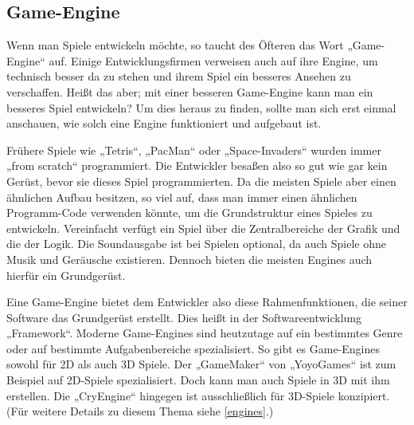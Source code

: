 \subsection{Game-Engine}	
\label{engine}
Wenn man Spiele entwickeln möchte, so taucht des Öfteren das Wort „Game-Engine“ auf. Einige Entwicklungsfirmen verweisen auch auf ihre Engine, um technisch besser da zu stehen und ihrem Spiel ein besseres Ansehen zu verschaffen. Heißt das aber; mit einer besseren Game-Engine kann man ein besseres Spiel entwickeln? Um dies heraus zu finden, sollte man sich erst einmal anschauen, wie solch eine Engine funktioniert und aufgebaut ist.

Frühere Spiele wie „Tetris“, „PacMan“ oder „Space-Invaders“ wurden immer „from scratch“  programmiert. Die Entwickler besaßen also so gut wie gar kein Gerüst, bevor sie dieses Spiel programmierten. Da die meisten Spiele aber einen ähnlichen Aufbau besitzen, so viel auf, dass man immer einen ähnlichen Programm-Code verwenden könnte, um die Grundstruktur eines Spieles zu entwickeln. Vereinfacht verfügt ein Spiel über die Zentralbereiche der Grafik und die der Logik. Die Soundausgabe ist bei Spielen optional, da auch Spiele ohne Musik und Geräusche existieren. Dennoch bieten die meisten Engines auch hierfür ein Grundgerüst.

Eine Game-Engine bietet dem Entwickler also diese Rahmenfunktionen, die seiner Software das Grundgerüst erstellt. Dies heißt in der Softwareentwicklung „Framework“. 
Moderne Game-Engines sind heutzutage auf ein bestimmtes Genre oder auf bestimmte Aufgabenbereiche spezialisiert. So gibt es Game-Engines sowohl für 2D als auch 3D Spiele. Der „GameMaker“ von „YoyoGames“ ist zum Beispiel auf 2D-Spiele spezialisiert. Doch kann man auch Spiele in 3D mit ihm erstellen. Die „CryEngine“ hingegen ist ausschließlich für 3D-Spiele konzipiert. (Für weitere Details zu diesem Thema siehe \ref{engines}.)
